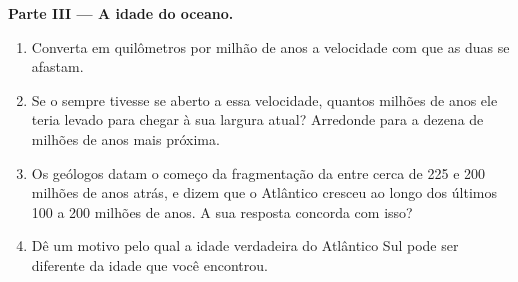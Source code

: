 \begin{problem}
\medskip
\noindent\textbf{Parte III --- A idade do oceano.}
\begin{enumerate}[resume]
  \item Converta em quilômetros por milhão de anos a velocidade com que as
        duas  se afastam.
  \item Se o  sempre tivesse se aberto a essa velocidade, quantos
        milhões de anos ele teria levado para chegar à sua largura atual?
        Arredonde para a dezena de milhões de anos mais próxima.
  \item Os geólogos datam o começo da fragmentação da  entre cerca
        de 225 e 200 milhões de anos atrás, e dizem que o Atlântico cresceu
        ao longo dos últimos 100 a 200 milhões de anos. A sua resposta
        concorda com isso?
  \item Dê um motivo pelo qual a idade verdadeira do Atlântico Sul pode ser
        diferente da idade que você encontrou.
\end{enumerate}
\end{problem}
